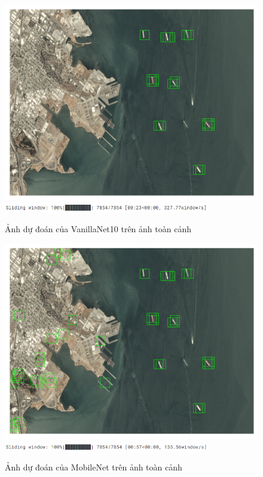 \documentclass[a4paper,12pt]{article}
\begin{document}
\begin{figure}[H]
    \centering
    \includegraphics[width=0.8\linewidth]{__results___38_2.png}
    \includegraphics[width=0.8\textwidth]{tqdm_vanillanet.png}
    \caption{Ảnh dự đoán của VanillaNet10 trên ảnh toàn cảnh}
\end{figure}

\begin{figure}[H]
    \centering
    \includegraphics[width=0.8\linewidth]{__results___38_5.png}
    \includegraphics[width=0.8\textwidth]{tqdm_mobilenet.png}
    \caption{Ảnh dự đoán của MobileNet trên ảnh toàn cảnh}
\end{figure}
\end{document}
